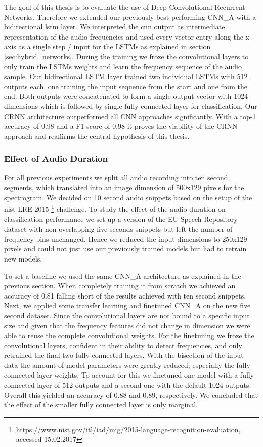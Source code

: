 The goal of this thesis is to evaluate the use of Deep Convolutional Recurrent Networks. Therefore we extended our previously best performing CNN\_A with a bidirectional \ac{lstm} layer. We interpreted the \ac{cnn} output as intermediate representation of the audio frequencies and used every vector entry along the x-axis as a single step / input for the LSTMs as explained in section \ref{sec:hybrid_networks}. During the training we froze the convolutional layers to only train the LSTMs weights and learn the frequency sequence of the audio sample. Our bidirectional LSTM layer trained two individual LSTMs with 512 outputs each, one training the input sequence from the start and one from the end. Both outputs were concatenated to form a single output vector with 1024 dimensions which is followed by single fully connected layer for classification.
Our CRNN architecture outperformed all CNN approaches significantly. With a top-1 accuracy of 0.98 and a F1 score of 0.98 it proves the viability of the CRNN approach and reaffirms the central hypothesis of this thesis.


\subsubsection{Effect of Audio Duration} 
\label{sec:duration}
For all previous experiments we split all audio recording into ten second segments, which translated into an image dimension of 500x129 pixels for the spectrogram. We decided on 10 second audio snippets based on the setup of the \ac{nist} LRE 2015 \footnote{\url{https://www.nist.gov/itl/iad/mig/2015-language-recognition-evaluation}, accessed 15.02.2017} challenge. To study the effect of the audio duration on classification performance we set up a version of the EU Speech Repository dataset with non-overlapping five seconds snippets but left the number of frequency bins unchanged. Hence we reduced the input dimensions to 250x129 pixels and could not just use our previously trained models but had to retrain new models.

To set a baseline we used the same CNN\_A architecture as explained in the previous section. When completely training it from scratch we achieved an accuracy of 0.81 falling short of the results achieved with ten second snippets. Next, we applied some transfer learning and finetuned CNN\_A on the new five second dataset. Since the convolutional layers are not bound to a specific input size and given that the frequency features did not change in dimension we were able to reuse the complete  convolutional weights. For the finetuning we froze the convolutional layers, confident in their ability to detect frequencies, and only retrained the final two fully connected layers. With the bisection of the input data the amount of model parameters were greatly reduced, especially the fully connected layer weights. To account for this we finetuned one model with a fully connected layer of 512 outputs and a second one with the default 1024 outputs. Overall this yielded an accuracy of 0.88 and 0.89, respectively. We concluded that the effect of the smaller fully connected layer is only marginal. 


